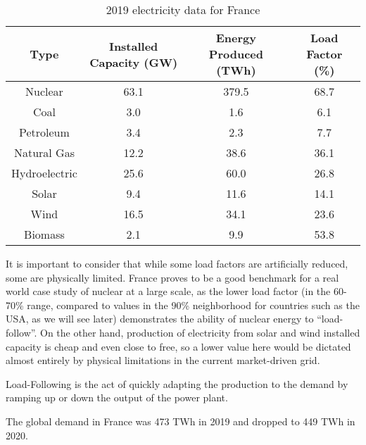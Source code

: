 \begin{table*}[ht]
\caption[2019 electricity data for France]{2019 electricity data for France}
\begin{tabular}{ c c c c }
	\toprule
	Type & Installed Capacity (GW) & Energy Produced (TWh) & Load Factor (\%) \\
	\midrule
	Nuclear & 63.1 & 379.5 & 68.7\\
	Coal & 3.0 & 1.6 & 6.1\\
	Petroleum & 3.4 & 2.3 & 7.7\\
	Natural Gas & 12.2 & 38.6 & 36.1\\
	Hydroelectric & 25.6 & 60.0 & 26.8\\
	Solar & 9.4 & 11.6 & 14.1\\
	Wind & 16.5 & 34.1 & 23.6\\
	Biomass & 2.1 & 9.9 & 53.8\\
	\bottomrule
\end{tabular}
\end{table*}


It is important to consider that while some load factors are artificially reduced, some are physically limited. France proves to be a good benchmark for a real world case study of nuclear at a large scale, as the lower load factor (in the 60-70\% range, compared to values in the 90\% neighborhood for countries such as the USA, as we will see later) demonstrates the ability of nuclear energy to “load-follow”. On the other hand, production of electricity from solar and wind installed capacity is cheap and even close to free, so a lower value here would be dictated almost entirely by physical limitations in the current market-driven grid.


\begin{kaobox}[frametitle=Load Follow]
Load-Following is the act of quickly adapting the production to the demand by ramping up or down the output of the power plant.
\end{kaobox}

The global demand in France was 473 TWh in 2019 and dropped to 449 TWh in 2020.


